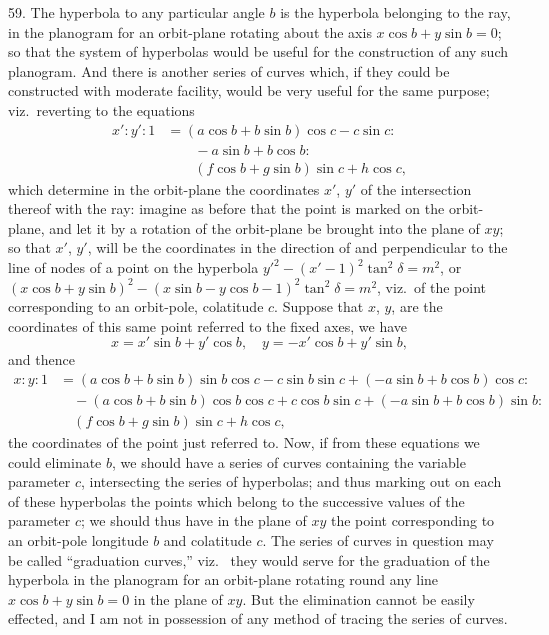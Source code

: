 \documentclass[11pt,a4paper]{article}
\theoremstyle{definition}
\begin{document}
59. The hyperbola to any particular angle $b$ is the hyperbola belonging to the ray, in
the planogram for an orbit-plane rotating about the axis $x\cos b+y\sin b=0$; so that the
system of hyperbolas would be useful for the construction of any such planogram. And
there is another series of curves which, if they could be constructed with moderate
facility, would be very useful for the same purpose; viz.~reverting to the equations
\begin{align*}
x' : y' : 1 &= (a\cos b+b\sin b)\cos c - c\sin c :\\
&\qquad -a\sin b + b\cos b :\\
&\qquad (f\cos b+g\sin b)\sin c + h\cos c,
\end{align*}
which determine in the orbit-plane the coordinates $x'$, $y'$ of the intersection thereof with
the ray: imagine as before that the point is marked on the orbit-plane, and let it by a
rotation of the orbit-plane be brought into the plane of $xy$; so that $x'$, $y'$, will be the
coordinates in the direction of and perpendicular to the line of nodes of a point on the
hyperbola $y'^2-(x'-1)^2\tan^2\delta=m^2$, or $(x\cos b+y\sin b)^2-(x\sin b-y\cos b-1)^2\tan^2\delta=m^2$,
viz.~of the point corresponding to an orbit-pole, colatitude $c$. Suppose that $x$, $y$, are
the coordinates of this same point referred to the fixed axes, we have
\[
x = x'\sin b + y'\cos b, \quad y = -x'\cos b + y'\sin b,
\]
and thence
\begin{align*}
x : y : 1 &= (a\cos b+b\sin b)\sin b\cos c - c\sin b\sin c + (-a\sin b+b\cos b)\cos c :\\
&\quad -(a\cos b+b\sin b)\cos b\cos c + c\cos b\sin c + (-a\sin b+b\cos b)\sin b :\\
&\quad (f\cos b+g\sin b)\sin c + h\cos c,
\end{align*}
the coordinates of the point just referred to. Now, if from these equations we could
eliminate $b$, we should have a series of curves containing the variable parameter $c$,
intersecting the series of hyperbolas; and thus marking out on each of these hyperbolas
the points which belong to the successive values of the parameter $c$; we should thus
have in the plane of $xy$ the point corresponding to an orbit-pole longitude $b$ and
colatitude $c$. The series of curves in question may be called ``graduation curves,'' viz.~
they would serve for the graduation of the hyperbola in the planogram for an orbit-plane
rotating round any line $x\cos b+y\sin b=0$ in the plane of $xy$. But the elimination
cannot be easily effected, and I am not in possession of any method of tracing the series
of curves.
\end{document}
